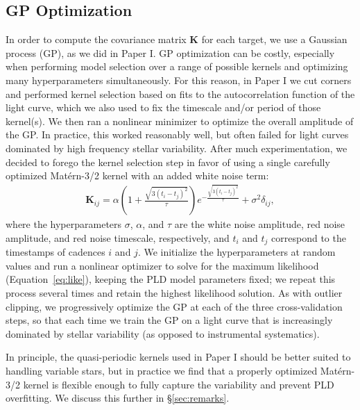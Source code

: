 \documentclass[]{aastex62}
\begin{document}
\subsection{GP Optimization}
\label{sec:impl_gp}
In order to compute the covariance matrix $\mathbf{K}$ for each target, we use a Gaussian
process (GP), as we did in Paper I. GP optimization can be costly, especially when
performing model selection over a range of possible kernels and optimizing many
hyperparameters simultaneously. For this reason, in Paper I we cut corners and performed
kernel selection based on fits to the autocorrelation function of the light curve, which
we also used to fix the timescale and/or period of those kernel(s). We then ran a nonlinear
minimizer to optimize the overall amplitude of the GP. In practice, this worked reasonably
well, but often failed for light curves dominated by high frequency stellar variability.
After much experimentation, we decided to forego the kernel selection step in favor of
using a single carefully optimized Mat\'ern-3/2 kernel with an added white noise term:
%
\begin{align}
\mathbf{K}_{ij} = \alpha \left(1 + \frac{\sqrt{3(t_i - t_j)^2}}{\tau}\right) e^{-\frac{\sqrt{3(t_i - t_j)^2}}{\tau}} + \sigma^2\delta_{ij},
\end{align}
%
where the hyperparameters $\sigma$, $\alpha$, and $\tau$ are the white noise amplitude,
red noise amplitude, and red noise timescale, respectively, and $t_i$ and $t_j$ correspond
to the timestamps of cadences $i$ and $j$. We initialize the hyperparameters at random
values and run a nonlinear optimizer to solve for the maximum likelihood (Equation~\ref{eq:like}),
keeping the PLD model parameters fixed; we repeat this process several times and retain the
highest likelihood solution. As with outlier clipping, we progressively optimize the GP
at each of the three cross-validation steps, so that each time we train the GP on a
light curve that is increasingly dominated by stellar variability (as opposed to instrumental
systematics).

In principle, the quasi-periodic kernels used in Paper I should be better suited to
handling variable stars, but in practice we find that a properly optimized Mat\'ern-3/2
kernel is flexible enough to fully capture the variability and prevent PLD overfitting.
We discuss this further in \S\ref{sec:remarks}.
\end{document}
